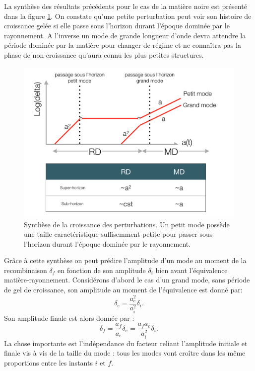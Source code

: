 La synthèse des résultats précédents pour le cas de la matière noire est présenté dans la figure \ref{f:perturb}. On constate qu'une petite perturbation peut voir son histoire de croissance gelée si elle passe sous l'horizon durant l'époque dominée par le rayonnement. A l'inverse un mode de grande longueur d'onde devra attendre la période dominée par la matière pour changer de régime et ne connaîtra pas la phase de non-croissance qu'aura connu les plus petites structures.

\begin{figure}[htbp]
	\centering
		\includegraphics[height=8cm]{figs/perturb.png}
		\caption{Synthèse de la croissance des perturbations. Un petit mode possède une taille caractéristique suffisemment petite pour passer sous l'horizon durant l'époque dominée par le rayonnement.}
	\label{f:perturb}
\end{figure}

Grâce à cette synthèse on peut prédire l'amplitude d'un mode au moment de la recombinaison $\delta_f$ en fonction de son amplitude $\delta_i$ bien avant l'équivalence matière-rayonnement. Considérons d'abord le cas d'un grand mode, sans période de gel de croissance, son amplitude au moment de l'équivalence est donné par:
\begin{equation}
\delta_e=\frac{a_e^2}{a_i^2}\delta_i.
\end{equation}
Son amplitude finale est alors donnée par :
\begin{equation}
\delta_f=\frac{a_f}{a_e}\delta_e=\frac{a_f a_e}{a_i^2}\delta_i.
\end{equation}
La chose importante est l'indépendance du facteur reliant l'amplitude initiale et finale vis à vis de la taille du mode : tous les modes vont croître dans les même proportions entre les instants $i$ et $f$. 

